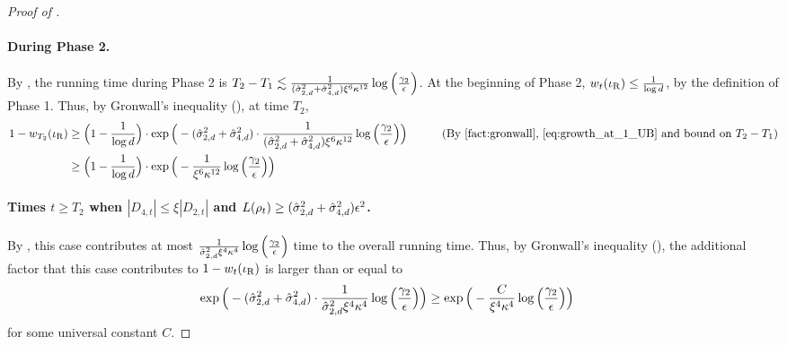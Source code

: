 \begin{proof}[Proof of ]
\paragraph{During Phase 2.} By , the running time during Phase 2 is $T_2 - T_1 \lesssim \frac{1}{(\hat{\sigma}_{2, d}^2 + \hat{\sigma}_{4, d}^2) \xi^6 \kappa^{12}} \log\Big(\frac{\gamma_2}{\epsilon}\Big)$. At the beginning of Phase 2, $w_t(\iota_{\textup{R}}) \leq \frac{1}{\log d}$, by the definition of Phase 1. Thus, by Gronwall's inequality (), at time $T_2$,
\begin{align}
1 - \w_{T_2}(\iotaR)
& \geq \Big(1 - \frac{1}{\log d}\Big) \cdot \exp\Big(-(\sigmaCoeffTwo^2 + \sigmaCoeffFour^2) \cdot \frac{1}{(\sigmaCoeffTwo^2 + \sigmaCoeffFour^2) \xi^6 \kappa^{12}} \log\Big(\frac{\gamma_2}{\epsilon}\Big)\Big)
& \tag{By \Cref{fact:gronwall}, \Cref{eq:growth_at_1_UB} and bound on $T_2 - T_1$} \\
& \geq \Big(1 - \frac{1}{\log d}\Big) \cdot \exp\Big(-\frac{1}{\xi^6 \kappa^{12}} \log\Big(\frac{\gamma_2}{\epsilon}\Big)\Big)
& \label{eq:phase_2_contribution}
\end{align}

\paragraph{Times $t \geq T_2$ when $|D_{4, t}| \leq \xi |D_{2, t}|$ and $L(\rho_t) \geq (\hat{\sigma}_{2, d}^2 + \hat{\sigma}_{4, d}^2) \epsilon^2$.} By , this case contributes at most $\frac{1}{\hat{\sigma}_{2, d}^2 \xi^4 \kappa^4} \log\Big(\frac{\gamma_2}{\epsilon}\Big)$ time to the overall running time. Thus, by Gronwall's inequality (), the additional factor that this case contributes to $1 - w_t(\iota_{\textup{R}})$ is larger than or equal to
\begin{align}
\exp\Big(-(\hat{\sigma}_{2, d}^2 + \hat{\sigma}_{4, d}^2) \cdot \frac{1}{\hat{\sigma}_{2, d}^2 \xi^4 \kappa^4} \log\Big(\frac{\gamma_2}{\epsilon}\Big)\Big) 
& \geq \exp\Big(-\frac{C}{\xi^4 \kappa^4} \log\Big(\frac{\gamma_2}{\epsilon}\Big)\Big)
\label{eq:d4_small_contribution}
\end{align}
for some universal constant $C$.


\end{proof}
